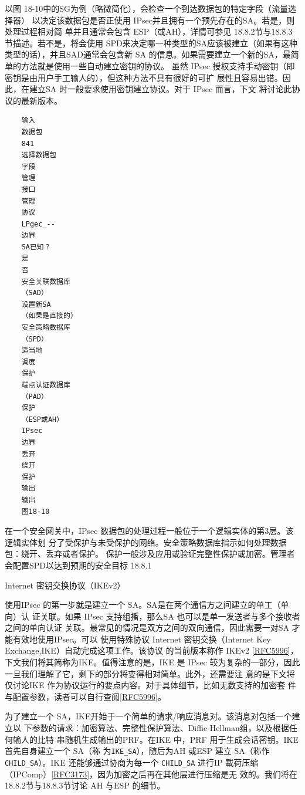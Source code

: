 以图 18-10中的SG为例（略微简化），会检查一个到达数据包的特定字段（流量选择器）
以决定该数据包是否正使用 IPsec并且拥有一个预先存在的SA。若是，则处理过程相对简
单并且通常会包含 ESP（或AH），详情可参见 18.8.2节与18.8.3节描述。若不是，将会使用
SPD来决定哪一种类型的SA应该被建立（如果有这种类型的话），并且SAD通常会包含新
SA 的信息。如果需要建立一个新的SA，最简单的方法就是使用一些自动建立密钥的协议。
虽然 IPsec 授权支持手动密钥（即密钥是由用户手工输人的），但这种方法不具有很好的可扩
展性且容易出错。因此，在建立SA 时一般要求使用密钥建立协议。对于 IPsec 而言，下文
将讨论此协议的最新版本。
\begin{verbatim}
    输入
    数据包
    841
    选择数据包
    字段
    管理
    接口
    管理
    协议
    LPgec_--
    边界
    SA已知？
    是
    否
    安全关联数据库
    （SAD）
    设置新SA
    （如果是直接的）
    安全策略数据库
    （SPD）
    适当地
    调度
    保护
    端点认证数据库
    （PAD）
    保护
    （ESP或AH）
    IPsec
    边界
    丢弃
    绕开
    保护
    输出
    输出
    图18-10
\end{verbatim}
在一个安全网关中，IPsec 数据包的处理过程一般位于一个逻辑实体的第3层。该逻辑实体划
分了受保护与未受保护的网络。安全策略数据库指示如何处理数据包：绕开、丢弃或者保护。
保护一般涉及应用或验证完整性保护或加密。管理者会配置SPD以达到预期的安全目标
18.8.1

Internet 密钥交换协议（IKEv2）

使用IPsec 的第一步就是建立一个 SA。SA是在两个通信方之间建立的单工（单向）认
证关联。如果 IPsec 支持组播，那么SA 也可以是单一发送者与多个接收者之间的单向认证
关联。最常见的情况是双方之间的双向通信，因此需要一对SA 才能有效地使用IPsec。可以
使用特殊协议 Internet 密钥交换（Internet Key Exchange,IKE）自动完成这项工作。该协议
的当前版本称作 IKEv2 \href{https://www.rfc-editor.org/rfc/rfc5996}{[RFC5996]}，下文我们将其简称为IKE。值得注意的是，IKE 是 IPsec
较为复杂的一部分，因此一旦我们理解了它，剩下的部分将变得相对简单。此外，还需要注
意的是下文将仅讨论IKE 作为协议运行的要点内容。对于具体细节，比如无数支持的加密套
件与配置参数，读者可以自行查阅\href{https://www.rfc-editor.org/rfc/rfc5996}{[RFC5996]}。

为了建立一个 SA，IKE开始于一个简单的请求/响应消息对。该消息对包括一个建立以
下参数的请求：加密算法、完整性保护算法、Diffie-Hellman组，以及根据任何输人的比特
串随机生成输出的PRF。在IKE 中，PRF 用于生成会话密钥。IKE 首先自身建立一个 SA（称
为\verb|IKE_SA|），随后为AH 或ESP 建立 SA（称作 \verb|CHILD_SA|）。IKE 还能够通过协商为每一个
\verb|CHILD_SA| 进行IP 載荷压缩（IPComp）\href{https://www.rfc-editor.org/rfc/rfc3173}{[RFC3173]}，因为加密之后再在其他层进行压缩是无
效的。我们将在18.8.2节与18.8.3节讨论 AH 与ESP 的细节。

